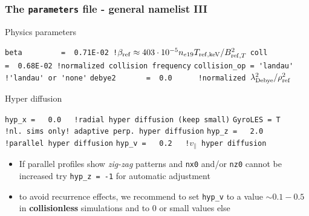 \documentclass[9pt]{beamer}
\begin{document}
\begin{frame}[fragile]
  \frametitle{The {\tt parameters} file - general namelist III}

\begin{block}{Physics parameters}

\verb|beta         =  0.71E-02 !|$\beta_{\rm ref}\approx 403\cdot 10^{-5} n_{e19} T_{{\rm ref} ,\mathrm{keV}}/B_{{\rm ref} ,T}^2$
\verb|coll         =  0.68E-02 !normalized collision frequency|
\verb|collision_op = 'landau'  !'landau' or 'none'|
\verb|debye2       =  0.0      !normalized |$\lambda^2_{\rm Debye}/\rho_{\rm ref}^2$
\end{block}

\begin{block}{Hyper diffusion}

\begin{block}

\verb|hyp_x =   0.0   !radial hyper diffusion (keep small)|
\verb|GyroLES = T     !nl. sims only! adaptive perp. hyper diffusion|
\verb|hyp_z =   2.0   !parallel hyper diffusion|
\verb|hyp_v =   0.2   !|$v_\parallel$\verb| hyper diffusion|
\end{block}
\begin{itemize}
\item If parallel profiles %
show {\em zig-zag} patterns and {\tt nx0} and/or {\tt nz0} cannot be increased try {\tt hyp\_z = -1} for automatic adjustment
\item to avoid recurrence effects, we recommend to set {\tt hyp\_v} to a value $\sim 0.1-0.5$ in {\bf collisionless} simulations and to $0$ or small values else
\end{itemize}
\end{block}

\end{frame}

\end{document}
